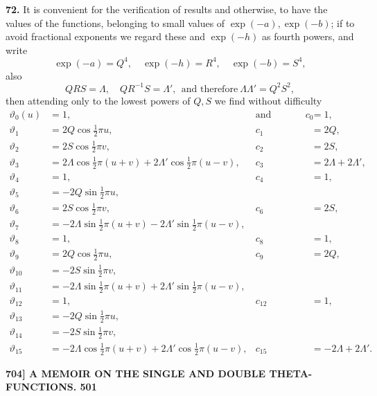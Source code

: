 \documentclass[11pt]{article}
\begin{document}
\medskip
\textbf{72.} It is convenient for the verification of results and otherwise, to have the values of the functions, belonging to small values of $\exp(-a), \exp(-b)$; if to avoid fractional exponents we regard these and $\exp(-h)$ as fourth powers, and write
\[
\exp(-a) = Q^4,\quad \exp(-h) = R^4,\quad \exp(-b) = S^4,
\]
also
\[
QRS = \Lambda,\quad QR^{-1}S = \Lambda',\ \ \text{and therefore}\ \Lambda\Lambda' = Q^2 S^2,
\]
then attending only to the lowest powers of $Q, S$ we find without difficulty
\[
\begin{aligned}
\vartheta_0(u) &= 1, & \text{and therefore also}\ c_0 &= 1,\\
\vartheta_1 &= 2Q\cos\tfrac{1}{2}\pi u, & c_1 &= 2Q,\\
\vartheta_2 &= 2S\cos\tfrac{1}{2}\pi v, & c_2 &= 2S,\\
\vartheta_3 &= 2\Lambda\cos\tfrac{1}{2}\pi(u+v) + 2\Lambda'\cos\tfrac{1}{2}\pi(u-v), & c_3 &= 2\Lambda + 2\Lambda',\\
\vartheta_4 &= 1, & c_4 &= 1,\\
\vartheta_5 &= -2Q\sin\tfrac{1}{2}\pi u,\\
\vartheta_6 &= 2S\cos\tfrac{1}{2}\pi v, & c_6 &= 2S,\\
\vartheta_7 &= -2\Lambda\sin\tfrac{1}{2}\pi(u+v) - 2\Lambda'\sin\tfrac{1}{2}\pi(u-v),\\
\vartheta_8 &= 1, & c_8 &= 1,\\
\vartheta_9 &= 2Q\cos\tfrac{1}{2}\pi u, & c_9 &= 2Q,\\
\vartheta_{10} &= -2S\sin\tfrac{1}{2}\pi v,\\
\vartheta_{11} &= -2\Lambda\sin\tfrac{1}{2}\pi(u+v) + 2\Lambda'\sin\tfrac{1}{2}\pi(u-v),\\
\vartheta_{12} &= 1, & c_{12} &= 1,\\
\vartheta_{13} &= -2Q\sin\tfrac{1}{2}\pi u,\\
\vartheta_{14} &= -2S\sin\tfrac{1}{2}\pi v,\\
\vartheta_{15} &= -2\Lambda\cos\tfrac{1}{2}\pi(u+v) + 2\Lambda'\cos\tfrac{1}{2}\pi(u-v), & c_{15} &= -2\Lambda + 2\Lambda'.
\end{aligned}
\]

\bigskip
\noindent\textbf{704] \hfill A MEMOIR ON THE SINGLE AND DOUBLE THETA-FUNCTIONS. \hfill 501}
\end{document}

